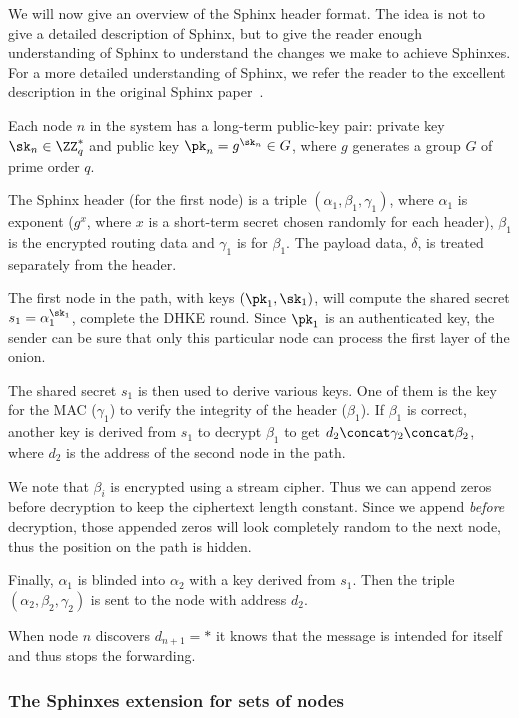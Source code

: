 We will now give an overview of the Sphinx header format.
The idea is not to give a detailed description of Sphinx, but to give the 
reader enough understanding of Sphinx to understand the changes we make to 
achieve Sphinxes.
For a more detailed understanding of Sphinx, we refer the reader to the 
excellent description in the original Sphinx paper~\cite{Sphinx}.

Each node \(n\) in the system has a long-term public-key pair: private key 
\(\sk_n\in \ZZ_q^*\) and public key \(\pk_n = g^{\sk_n}\in G\), where \(g\) 
generates a group \(G\) of prime order \(q\).

The Sphinx header (for the first node) is a triple \((\alpha_1, \beta_1, 
  \gamma_1)\), where \(\alpha_1\) is  exponent (\(g^x\), where \(x\) 
is a short-term secret chosen randomly for each header), \(\beta_1\) is the 
encrypted routing data and \(\gamma_1\) is  for \(\beta_1\).
The payload data, \(\delta\), is treated separately from the header.

The first node in the path, with keys \((\pk_1, \sk_1)\), will compute the 
shared secret \(s_1 = \alpha_1^{\sk_1}\), \ie complete the \ac{DHKE} round.
Since \(\pk_1\) is an authenticated key, the sender can be sure that only this 
particular node can process the first layer of the onion.

The shared secret \(s_1\) is then used to derive various keys.
One of them is the key for the \ac{MAC} (\(\gamma_1\)) to verify the integrity 
of the header (\(\beta_1\)).
If \(\beta_1\) is correct, another key is derived from \(s_1\) to decrypt 
\(\beta_1\) to get \(d_2\concat \gamma_2\concat \beta_2\), where \(d_2\) is the 
address of the second node in the path.

We note that \(\beta_i\) is encrypted using a stream cipher.
Thus we can append zeros before decryption to keep the ciphertext length 
constant.
Since we append \emph{before} decryption, those appended zeros will look 
completely random to the next node, thus the position on the path is hidden.

Finally, \(\alpha_1\) is blinded into \(\alpha_2\) with a key derived from 
\(s_1\).
Then the triple \((\alpha_2, \beta_2, \gamma_2)\) is sent to the node with 
address \(d_2\).

When node \(n\) discovers \(d_{n+1} = *\) it knows that the message is intended 
for itself and thus stops the forwarding.

\subsubsection{The Sphinxes extension for sets of nodes}

